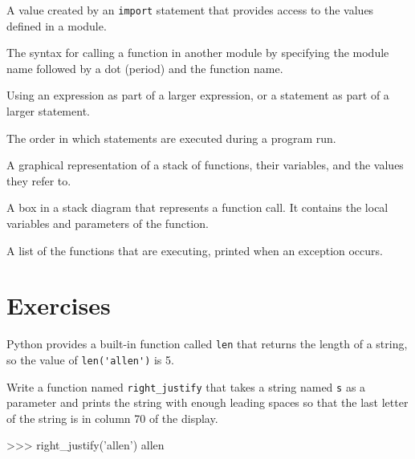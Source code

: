 \begin{vocabulary} A value created by an {\tt import} statement
that provides access to the values defined in a module.
\end{vocabulary}
	
\begin{vocabulary}  The syntax for calling a function in another
module by specifying the module name followed by a dot (period) and
the function name.
\end{vocabulary}
	
\begin{vocabulary}[composition:] Using an expression as part of a larger expression,
or a statement as part of a larger statement.
\end{vocabulary}
	
\begin{vocabulary}  The order in which statements are executed during
a program run.
\end{vocabulary}
	
\begin{vocabulary}  A graphical representation of a stack of functions,
their variables, and the values they refer to.
\end{vocabulary}
	
\begin{vocabulary}[frame:]  A box in a stack diagram that represents a function call.
It contains the local variables and parameters of the function.
\end{vocabulary}
	
\begin{vocabulary}[traceback:]  A list of the functions that are executing,
printed when an exception occurs.
\end{vocabulary}


\section{Exercises}

\begin{exercise}


Python provides a built-in function called {\tt len} that
returns the length of a string, so the value of \verb"len('allen')" is 5.

Write a function named \verb"right_justify" that takes a string
named {\tt s} as a parameter and prints the string with enough
leading spaces so that the last letter of the string is in column 70
of the display.

\beforeverb
\begin{pyexo}
>>> right_justify('allen')
                                                       allen
\end{pyexo}
\afterverb

\end{exercise}


